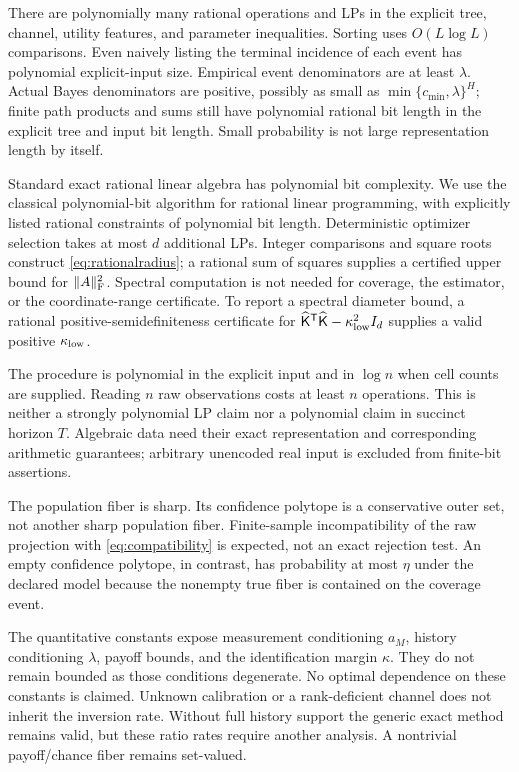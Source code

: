 \documentclass[11pt,a4paper]{article}
\numberwithin{equation}{section}
\theoremstyle{definition}
\begin{document}
There are polynomially many rational operations and LPs in the
explicit tree, channel, utility features, and parameter inequalities.
Sorting uses \(O(L\log L)\) comparisons.
Even naively listing the terminal incidence of each event has
polynomial explicit-input size.
Empirical event denominators are at least \(\lambda\).
Actual Bayes denominators are positive, possibly as small as
\(\min\{c_{\min},\lambda\}^{H}\); finite path products and sums
still have polynomial rational bit length in the explicit tree
and input bit length. Small probability is not large representation
length by itself.

Standard exact rational linear algebra has polynomial bit complexity.
We use the classical polynomial-bit algorithm for rational linear
programming, with explicitly listed rational constraints of polynomial
bit length. Deterministic optimizer selection takes at most \(d\)
additional LPs. Integer comparisons and square roots construct
\eqref{eq:rationalradius}; a rational sum of squares supplies a
certified upper bound for \(\|A\|_{\rm F}^2\).
Spectral computation is not needed for coverage, the estimator,
or the coordinate-range certificate. To report a spectral diameter
bound, a rational positive-semidefiniteness certificate for
\(\widehat{\mathsf K}^{\mathsf T}\widehat{\mathsf K}
 -\kappa_{\rm low}^2I_d\) supplies a valid positive
\(\kappa_{\rm low}\).

The procedure is polynomial in the explicit input and in \(\log n\)
when cell counts are supplied. Reading \(n\) raw observations costs
at least \(n\) operations. This is neither a strongly polynomial LP
claim nor a polynomial claim in succinct horizon \(T\).
Algebraic data need their exact representation and corresponding
arithmetic guarantees; arbitrary unencoded real input is excluded
from finite-bit assertions.

The population fiber is sharp. Its confidence polytope is a conservative
outer set, not another sharp population fiber.
Finite-sample incompatibility of the raw projection with
\eqref{eq:compatibility} is expected, not an exact rejection test.
An empty confidence polytope, in contrast, has probability at most
\(\eta\) under the declared model because the nonempty true fiber
is contained on the coverage event.

The quantitative constants expose measurement conditioning \(a_M\),
history conditioning \(\lambda\), payoff bounds, and the identification
margin \(\kappa\). They do not remain bounded as those conditions
degenerate. No optimal dependence on these constants is claimed.
Unknown calibration or a rank-deficient channel does not inherit
the inversion rate. Without full history support the generic exact
method remains valid, but these ratio rates require another analysis.
A nontrivial payoff/chance fiber remains set-valued.
\end{document}
